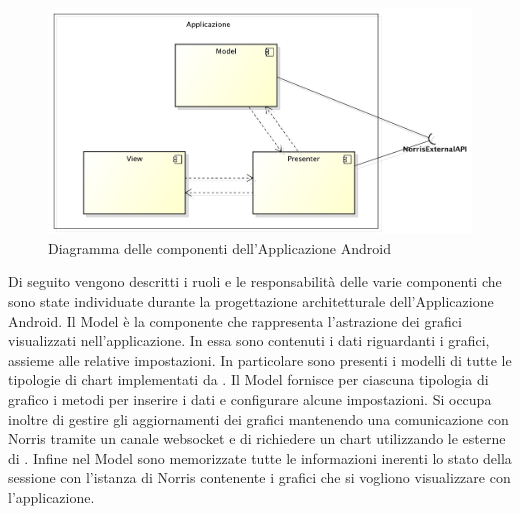         \begin{figure}[H]\centering
            \includegraphics[width=\textwidth]{SpecificaTecnica/Pics/ComponentiApplicazione}
            \caption{Diagramma delle componenti dell'Applicazione Android}
        \end{figure}
        Di seguito vengono descritti i ruoli e le responsabilità delle varie componenti che sono state individuate durante la progettazione architetturale dell'Applicazione Android.
            Il Model è la componente che rappresenta l'astrazione dei grafici visualizzati nell'applicazione. In essa sono contenuti i dati riguardanti i grafici, assieme alle relative impostazioni. In particolare sono presenti i modelli di tutte le tipologie di chart implementati da . Il Model fornisce per ciascuna tipologia di grafico i metodi per inserire i dati e configurare alcune impostazioni. Si occupa inoltre di gestire gli aggiornamenti dei grafici mantenendo una comunicazione con Norris tramite un canale websocket e di richiedere un chart utilizzando le  esterne di . Infine nel Model sono memorizzate tutte le informazioni inerenti lo stato della sessione con l'istanza di Norris contenente i grafici che si vogliono visualizzare con l'applicazione.
    
